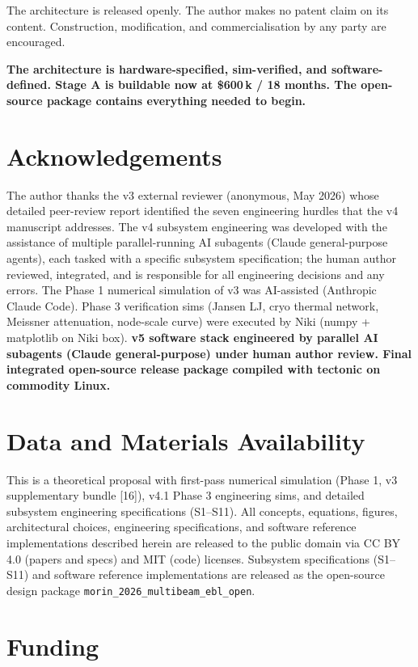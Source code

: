 \documentclass[11pt,letterpaper]{article}
\begin{document}
The architecture is released openly. The author makes no patent claim on its content. Construction, modification, and commercialisation by any party are encouraged.

\medskip
\noindent\textbf{The architecture is hardware-specified, sim-verified, and software-defined. Stage A is buildable now at \$600\,k / 18 months. The open-source package contains everything needed to begin.}

\section*{Acknowledgements}

The author thanks the v3 external reviewer (anonymous, May 2026) whose detailed peer-review report identified the seven engineering hurdles that the v4 manuscript addresses. The v4 subsystem engineering was developed with the assistance of multiple parallel-running AI subagents (Claude general-purpose agents), each tasked with a specific subsystem specification; the human author reviewed, integrated, and is responsible for all engineering decisions and any errors. The Phase 1 numerical simulation of v3 was AI-assisted (Anthropic Claude Code). Phase 3 verification sims (Jansen LJ, cryo thermal network, Meissner attenuation, node-scale curve) were executed by Niki (numpy + matplotlib on Niki box). \textbf{v5 software stack engineered by parallel AI subagents (Claude general-purpose) under human author review. Final integrated open-source release package compiled with tectonic on commodity Linux.}

\section*{Data and Materials Availability}

This is a theoretical proposal with first-pass numerical simulation (Phase 1, v3 supplementary bundle [16]), v4.1 Phase 3 engineering sims, and detailed subsystem engineering specifications (S1--S11). All concepts, equations, figures, architectural choices, engineering specifications, and software reference implementations described herein are released to the public domain via CC BY 4.0 (papers and specs) and MIT (code) licenses. Subsystem specifications (S1--S11) and software reference implementations are released as the open-source design package \texttt{morin\_2026\_multibeam\_ebl\_open}.

\section*{Funding}
\end{document}

